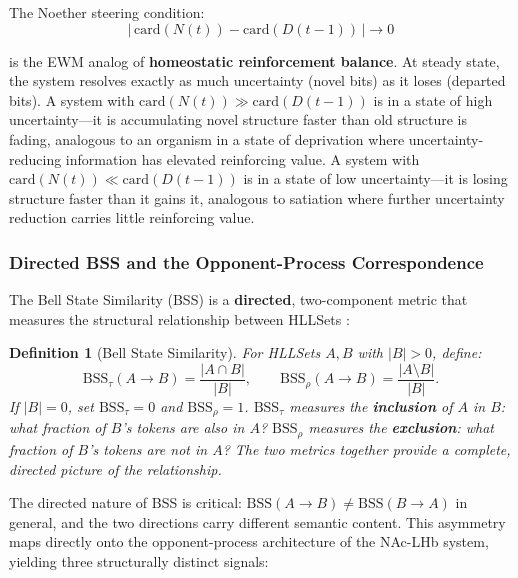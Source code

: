 \documentclass[11pt,a4paper]{article}
\newtheorem{definition}{Definition}[section]
\theoremstyle{remark}
\begin{document}
The Noether steering condition:
\begin{equation}
  |\,\text{card}(N(t)) - \text{card}(D(t-1))\,| \to 0
\end{equation}

is the EWM analog of \textbf{homeostatic reinforcement balance}. At steady
state, the system resolves exactly as much uncertainty (novel bits) as it loses
(departed bits). A system with $\text{card}(N(t)) \gg \text{card}(D(t-1))$ is
in a state of high uncertainty---it is accumulating novel structure faster than
old structure is fading, analogous to an organism in a state of deprivation
where uncertainty-reducing information has elevated reinforcing value. A system
with $\text{card}(N(t)) \ll \text{card}(D(t-1))$ is in a state of low
uncertainty---it is losing structure faster than it gains it, analogous to
satiation where further uncertainty reduction carries little reinforcing value.

\subsubsection{Directed BSS and the Opponent-Process Correspondence}

The Bell State Similarity (BSS) is a \textbf{directed}, two-component metric
that measures the structural relationship between HLLSets \cite{astesj2026}:

\begin{definition}[Bell State Similarity]
For HLLSets $A, B$ with $|B| > 0$, define:
\begin{equation}
  \text{BSS}_{\tau}(A \to B) = \frac{|A \cap B|}{|B|},
  \qquad
  \text{BSS}_{\rho}(A \to B) = \frac{|A \setminus B|}{|B|}.
\end{equation}
If $|B| = 0$, set $\text{BSS}_{\tau} = 0$ and $\text{BSS}_{\rho} = 1$.
$\text{BSS}_{\tau}$ measures the \textbf{inclusion} of $A$ in $B$: what fraction
of $B$'s tokens are also in $A$? $\text{BSS}_{\rho}$ measures the
\textbf{exclusion}: what fraction of $B$'s tokens are \textit{not} in $A$?
The two metrics together provide a complete, directed picture of the
relationship.
\end{definition}

The directed nature of BSS is critical: $\text{BSS}(A \to B) \neq
\text{BSS}(B \to A)$ in general, and the two directions carry different
semantic content. This asymmetry maps directly onto the opponent-process
architecture of the NAc-LHb system, yielding three structurally distinct
signals:
\end{document}
